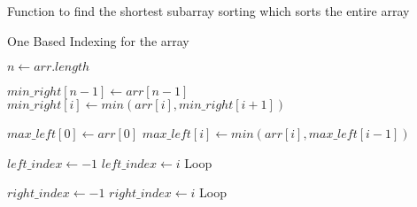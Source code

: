 \documentclass[12pt]{article}
\newcommand{\Break}{\textbf{Break}}
\begin{document}
\begin{algorithm}

  \caption{Function to find the shortest subarray sorting which sorts the entire array}
  \begin{algorithmic}[1]
    \Ensure One Based Indexing for the array
    \Statex
        \Statex
        
        \State $n \gets arr.length$
            \State {}
        \EndIf
        
        \Statex
        \State $min\_right[n - 1] \gets arr[n - 1]$
            \State $min\_right[i] \gets min(arr[i], min\_right[i + 1])$
        \EndFor
        
        \Statex
        \State $max\_left[0] \gets arr[0]$
            \State $max\_left[i] \gets min(arr[i], max\_left[i - 1])$
        \EndFor
        
        \Statex
        \State $left\_index \gets -1$
                \State $left\_index \gets i$
                \State{\Break} Loop
            \EndIf
        \EndFor
        
        \Statex
        \State $right\_index \gets -1$
                \State $right\_index \gets i$
                \State{\Break} Loop
            \EndIf
        \EndFor
        
        \Statex
            \State {}
        \Else
            \State {}
        \EndIf
    \EndFunction
  \end{algorithmic}
  
\end{algorithm}
\end{document}
